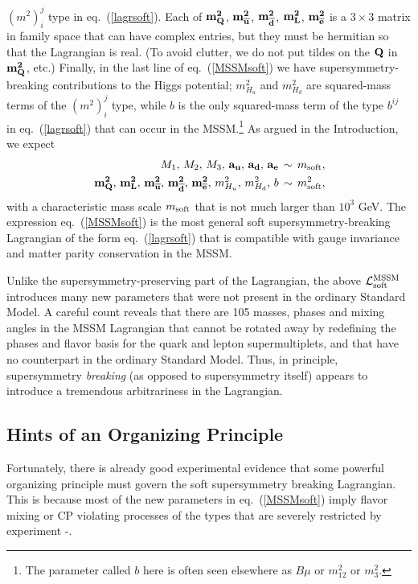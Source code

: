 \documentclass[12pt]{article}
\def\beq{\begin{eqnarray}}
\def\eeq{\end{eqnarray}}
\def\sbar{\overline}
\def\lagr{{\cal L}}
\begin{document}
$(m^2)_i^j$ type in eq.~(\ref{lagrsoft}). Each of ${\bf m^2_{ Q}}$, ${\bf
m^2_{{\sbar u}}}$, ${\bf m^2_{{\sbar d}}}$, ${\bf m^2_{L}}$, ${\bf
m^2_{{\sbar e}}}$ is a $3\times 3$ matrix in family space that can have
complex entries, but they must be hermitian so that the Lagrangian is
real. (To avoid clutter, we do not put tildes on the $\bf Q$ in $\bf
m^2_Q$, etc.) Finally, in the last line of eq.~(\ref{MSSMsoft}) we have
supersymmetry-breaking contributions to the Higgs potential; $m_{H_u}^2$
and $m_{H_d}^2$ are squared-mass terms of the $(m^2)_i^j$ type, while $b$
is the only squared-mass term of the type $b^{ij}$ in eq.~(\ref{lagrsoft})
that can occur in the MSSM.\footnote{The parameter called $b$ here is often
seen elsewhere as $B\mu$ or $m_{12}^2$ or $m_3^2$.} As argued in
the Introduction, we expect
\beq
&&\!\!\!\!\! M_1,\, M_2,\, M_3,\, {\bf a_u},\, {\bf a_d},\, {\bf a_e}\,
\sim\, m_{\rm soft},\\
&&\!\!\!\!\! {\bf m^2_{ Q}},\,
{\bf m^2_{L}},\,
{\bf m^2_{{\sbar u}}},\,
{\bf m^2_{{\sbar d}}},\,
{\bf m^2_{{\sbar e}}},\, m_{H_u}^2,\, m_{H_d}^2,\, b\, \sim \,
m_{\rm soft}^2 ,
\eeq
with a characteristic mass scale $m_{\rm soft}$ that is not much larger
than $10^3$ GeV. The expression eq.~(\ref{MSSMsoft}) is the most general
soft supersymmetry-breaking Lagrangian of the form eq.~(\ref{lagrsoft})
that is compatible with gauge invariance and matter parity conservation in
the MSSM. 

Unlike the supersymmetry-preserving part of the Lagrangian, the above
$\lagr_{\rm soft}^{\rm MSSM}$ introduces many new parameters that were not
present in the ordinary Standard Model. A careful count \cite{dimsut}
reveals that there are 105 masses, phases and mixing angles in the MSSM
Lagrangian that cannot be rotated away by redefining the phases and flavor
basis for the quark and lepton supermultiplets, and that have no
counterpart in the ordinary Standard Model. Thus, in principle,
supersymmetry {\em breaking} (as opposed to supersymmetry itself) appears
to introduce a tremendous arbitrariness in the Lagrangian. 

\subsection{Hints of an Organizing Principle}\label{subsec:mssm.hints}
\setcounter{equation}{0}

Fortunately, there is already good experimental evidence that some
powerful organizing principle must govern the soft supersymmetry breaking
Lagrangian. This is because most of the new parameters in
eq.~(\ref{MSSMsoft}) imply flavor mixing or CP violating processes of the
types that are severely restricted by experiment
\cite{FCNCs}-\cite{Ciuchini:2002uv}. 
\end{document}
